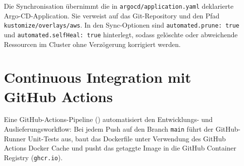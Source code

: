 Die Synchronisation übernimmt die in \texttt{argocd/application.yaml} deklarierte Argo-CD-Application. Sie verweist auf das Git-Repository und den Pfad \texttt{kustomize/overlays/aws}. In den Sync-Optionen sind \texttt{automated.prune: true} und \texttt{automated.selfHeal: true} hinterlegt, sodass gelöschte oder abweichende Ressourcen im Cluster ohne Verzögerung korrigiert werden.

\section{Continuous Integration mit GitHub Actions}
\label{sec:ci-pipeline}
Eine GitHub-Actions-Pipeline () automatisiert den Entwicklungs- und Auslieferungsworkflow: Bei jedem Push auf den Branch \texttt{main} führt der GitHub-Runner Unit-Tests aus, baut das Dockerfile unter Verwendung des GitHub Actions Docker Cache und pusht das getaggte Image in die GitHub Container Registry (\texttt{ghcr.io}).
